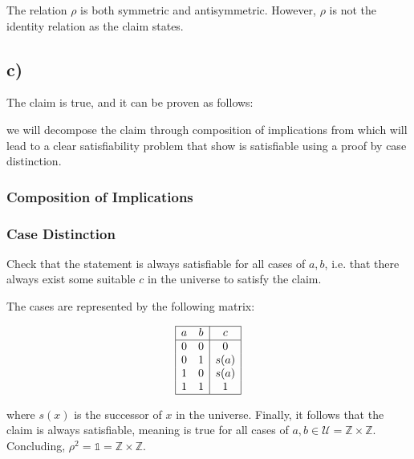 \documentclass[unicode,11pt,a4paper,oneside,numbers=endperiod,openany]{scrartcl}
\begin{document}
The relation \( \rho \) is both symmetric and antisymmetric.
However, \( \rho \) is not the identity relation as the claim states.

\subsection*{c)}

The claim is true, and it can be proven as follows:

we will decompose the claim through composition of implications from which will lead
to a clear satisfiability problem that show is satisfiable using a proof by case distinction.

\subsubsection*{Composition of Implications}

\subsubsection*{Case Distinction}

Check that the statement is always satisfiable for all cases of \( a, b \),
i.e. that there always exist some suitable \( c \) in the universe to satisfy the claim.

The cases are represented by the following matrix:

\[
    \begin{array}{|cc|c|}
        \hline
        a & b & c \\
        \hline
        0 & 0 & 0    \\
        0 & 1 & s(a) \\
        1 & 0 & s(a) \\
        1 & 1 & 1    \\
        \hline
    \end{array}
\]

where \( s(x) \) is the successor of \( x \) in the universe.
Finally, it follows that the claim is always satisfiable, 
meaning is true for all cases of \( a, b \in \mathcal{U} = \mathbb{Z} \times \mathbb{Z} \).
Concluding, \( \rho^2 = \mathds{1} = \mathbb{Z} \times \mathbb{Z} \).
\end{document}
